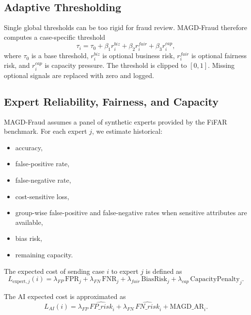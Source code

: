 \subsection{Adaptive Thresholding}
\label{subsec:adaptive_threshold}

Single global thresholds can be too rigid for fraud review. MAGD-Fraud therefore computes a case-specific threshold
\begin{equation}
\tau_i = \tau_0
+ \beta_1 r^{biz}_i
+ \beta_2 r^{fair}_i
+ \beta_3 r^{cap}_i,
\end{equation}
where $\tau_0$ is a base threshold, $r^{biz}_i$ is optional business risk, $r^{fair}_i$ is optional fairness risk, and $r^{cap}_i$ is capacity pressure. The threshold is clipped to $[0,1]$. Missing optional signals are replaced with zero and logged.

\subsection{Expert Reliability, Fairness, and Capacity}
\label{subsec:expert_routing}

MAGD-Fraud assumes a panel of synthetic experts provided by the FiFAR benchmark. For each expert $j$, we estimate historical:
\begin{itemize}
\item accuracy,
\item false-positive rate,
\item false-negative rate,
\item cost-sensitive loss,
\item group-wise false-positive and false-negative rates when sensitive attributes are available,
\item bias risk,
\item remaining capacity.
\end{itemize}

The expected cost of sending case $i$ to expert $j$ is defined as
\begin{equation}
L_{\text{expert},j}(i) =
\lambda_{FP}\,\text{FPR}_j
+ \lambda_{FN}\,\text{FNR}_j
+ \lambda_{fair}\,\text{BiasRisk}_j
+ \lambda_{cap}\,\text{CapacityPenalty}_j.
\end{equation}

The AI expected cost is approximated as
\begin{equation}
L_{AI}(i) =
\lambda_{FP}\,\widehat{FP\_risk}_i
+ \lambda_{FN}\,\widehat{FN\_risk}_i
+ \text{MAGD\_AR}_i.
\end{equation}

